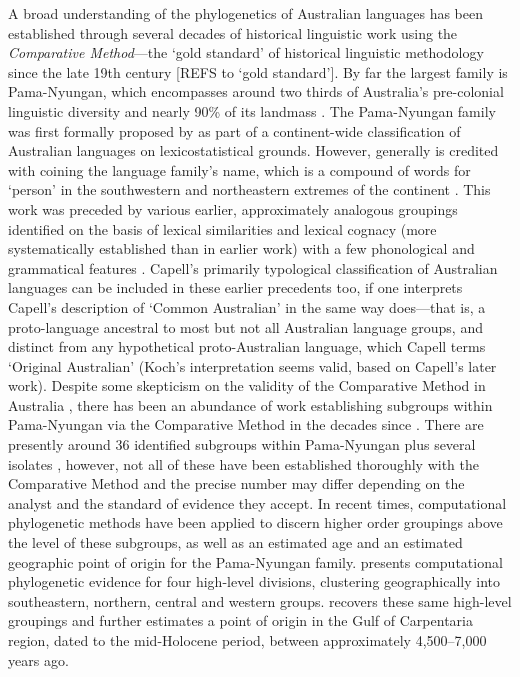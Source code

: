 A broad understanding of the phylogenetics of Australian languages has been established through several decades of historical linguistic work using the \emph{Comparative Method}---the `gold standard' of historical linguistic methodology since the late 19th century {[}REFS to `gold standard'{]}. By far the largest family is Pama-Nyungan, which encompasses around two thirds of Australia's pre-colonial linguistic diversity and nearly 90\% of its landmass \autocite[p.~817]{bowern_computational_2012}. The Pama-Nyungan family was first formally proposed by \textcite{ogrady_languages_1966} as part of a continent-wide classification of Australian languages on lexicostatistical grounds. However, \textcite{hale_classification_1964} generally is credited with coining the language family's name, which is a compound of words for `person' in the southwestern and northeastern extremes of the continent \autocite[see also][]{wurm_aboriginal_1963}. This work was preceded by various earlier, approximately analogous groupings identified on the basis of lexical similarities \autocites[pp.~207--212]{grey_journals_1841}[p.~iv]{moorhouse_vocabulary_1846} and lexical cognacy (more systematically established than in earlier work) with a few phonological and grammatical features \autocites{schmidt_gliederung_1919}{kroeber_relationships_1923}. Capell's \autocites{capell_structure_1937}{capell_classification_1940} primarily typological classification of Australian languages can be included in these earlier precedents too, if one interprets Capell's description of `Common Australian' in the same way \textcite{koch_methodological_2004} does---that is, a proto-language ancestral to most but not all Australian language groups, and distinct from any hypothetical proto-Australian language, which Capell terms `Original Australian' (Koch's interpretation seems valid, based on Capell's \autocite*{capell_history_1979} later work). Despite some skepticism on the validity of the Comparative Method in Australia \autocites{dixon_australian_2002}[but see][ for a counter-argument]{ogrady_coherence_2004}, there has been an abundance of work establishing subgroups within Pama-Nyungan via the Comparative Method in the decades since \textcites{ogrady_languages_1966}[see an overview and several examples in][]{bowern_australian_2004}. There are presently around 36 identified subgroups within Pama-Nyungan plus several isolates \autocite[following][]{bowern_pama-nyungan_2018}, however, not all of these have been established thoroughly with the Comparative Method and the precise number may differ depending on the analyst and the standard of evidence they accept. In recent times, computational phylogenetic methods have been applied to discern higher order groupings above the level of these subgroups, as well as an estimated age and an estimated geographic point of origin for the Pama-Nyungan family. \textcite{bowern_computational_2012} presents computational phylogenetic evidence for four high-level divisions, clustering geographically into southeastern, northern, central and western groups. \textcite{bouckaert_origin_2018} recovers these same high-level groupings and further estimates a point of origin in the Gulf of Carpentaria region, dated to the mid-Holocene period, between approximately 4,500--7,000 years ago.


